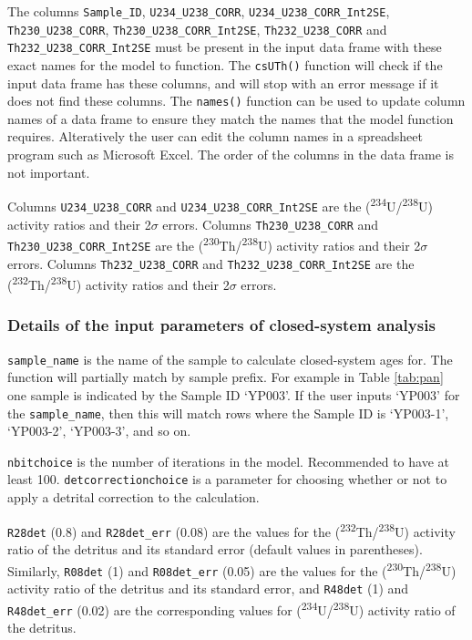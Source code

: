\documentclass[]{elsarticle} %
\begin{document}
The columns \texttt{Sample\_ID}, \texttt{U234\_U238\_CORR}, \texttt{U234\_U238\_CORR\_Int2SE}, \texttt{Th230\_U238\_CORR}, \texttt{Th230\_U238\_CORR\_Int2SE}, \texttt{Th232\_U238\_CORR} and \texttt{Th232\_U238\_CORR\_Int2SE} must be present in the input data frame with these exact names for the model to function. The \texttt{csUTh()} function will check if the input data frame has these columns, and will stop with an error message if it does not find these columns. The \texttt{names()} function can be used to update column names of a data frame to ensure they match the names that the model function requires. Alteratively the user can edit the column names in a spreadsheet program such as Microsoft Excel. The order of the columns in the data frame is not important.

Columns \texttt{U234\_U238\_CORR} and \texttt{U234\_U238\_CORR\_Int2SE} are the (\textsuperscript{234}U/\textsuperscript{238}U) activity ratios and their 2\(\sigma\) errors. Columns \texttt{Th230\_U238\_CORR} and \texttt{Th230\_U238\_CORR\_Int2SE} are the (\textsuperscript{230}Th/\textsuperscript{238}U) activity ratios and their 2\(\sigma\) errors. Columns \texttt{Th232\_U238\_CORR} and \texttt{Th232\_U238\_CORR\_Int2SE} are the (\textsuperscript{232}Th/\textsuperscript{238}U) activity ratios and their 2\(\sigma\) errors.

\hypertarget{details-of-the-input-parameters-of-closed-system-analysis}{%
\subsubsection{Details of the input parameters of closed-system analysis}\label{details-of-the-input-parameters-of-closed-system-analysis}}

\texttt{sample\_name} is the name of the sample to calculate closed-system ages for. The function will partially match by sample prefix. For example in Table \ref{tab:pan} one sample is indicated by the Sample ID `YP003'. If the user inputs `YP003' for the \texttt{sample\_name}, then this will match rows where the Sample ID is `YP003-1', `YP003-2', `YP003-3', and so on.

\texttt{nbitchoice} is the number of iterations in the model. Recommended to have at least 100.
\texttt{detcorrectionchoice} is a parameter for choosing whether or not to apply a detrital correction to the calculation.

\texttt{R28det} (0.8) and \texttt{R28det\_err} (0.08) are the values for the (\textsuperscript{232}Th/\textsuperscript{238}U) activity ratio of the detritus and its standard error (default values in parentheses). Similarly, \texttt{R08det} (1) and \texttt{R08det\_err} (0.05) are the values for the (\textsuperscript{230}Th/\textsuperscript{238}U) activity ratio of the detritus and its standard error, and \texttt{R48det} (1) and \texttt{R48det\_err} (0.02) are the corresponding values for (\textsuperscript{234}U/\textsuperscript{238}U) activity ratio of the detritus.
\end{document}
